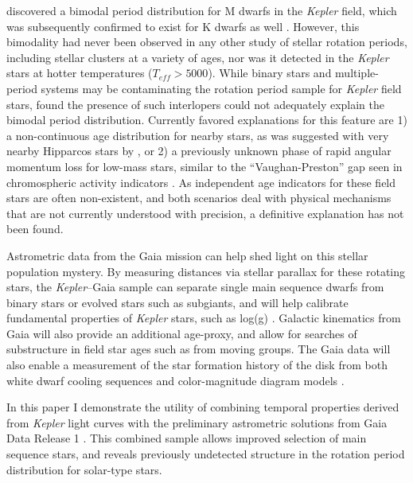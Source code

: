 \documentclass[manuscript, letterpaper]{aastex6}
\newcommand{\Kepler}{\textsl{Kepler}\xspace}
\begin{document}
\citet{mcquillan2013} discovered a bimodal period distribution for M dwarfs in the \Kepler field, which was subsequently confirmed to exist for K dwarfs as well \citep{mcquillan2014}. However, this bimodality had never been observed in any other study of stellar rotation periods, including stellar clusters at a variety of ages, nor was it detected in the \Kepler stars at hotter temperatures ($T_{eff} > 5000$). While binary stars and multiple-period systems may be contaminating the rotation period sample for \Kepler field stars, \citet{mcquillan2014} found the presence of such interlopers could not adequately explain the bimodal period distribution. Currently favored explanations for this feature are 1) a non-continuous age distribution for nearby stars, as was suggested with very nearby Hipparcos stars by \citet{hernandez2000}, or 2) a previously unknown phase of rapid angular momentum loss for low-mass stars, similar to the ``Vaughan-Preston'' gap seen in chromospheric activity indicators \citep{vaughan1980}. As independent age indicators for these field stars are often non-existent, and both scenarios deal with physical mechanisms that are not currently understood with precision, a definitive explanation has not been found.


Astrometric data from the Gaia mission \citep{gaia} can help shed light on this stellar population mystery. By measuring distances via stellar parallax for these rotating stars, the \Kepler--Gaia sample can separate single main sequence dwarfs from binary stars or evolved stars such as subgiants, and will help calibrate fundamental properties of \Kepler stars, such as log(g) \citep{creevey2013}. Galactic kinematics from Gaia will also provide an additional age-proxy, and allow for searches of substructure in field star ages such as from moving groups. The Gaia data will also enable a measurement of the star formation history of the disk from both white dwarf cooling sequences \citep{carrasco2014,gaensicke2015} and color-magnitude diagram models \citep{bertelli1999}.


In this paper I demonstrate the utility of combining temporal properties derived from \Kepler light curves with the preliminary astrometric solutions from  Gaia Data Release 1 \citep[hereafter DR1][]{gaia_dr1}. This combined sample allows improved selection of main sequence stars, and reveals previously undetected structure in the rotation period distribution for solar-type stars.
\end{document}
